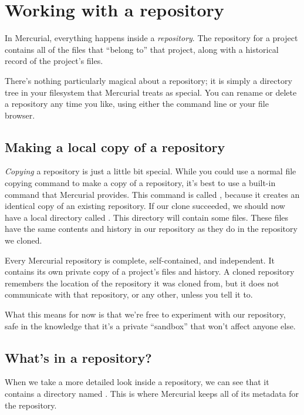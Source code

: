 \section{Working with a repository}

In Mercurial, everything happens inside a \emph{repository}.  The
repository for a project contains all of the files that ``belong to''
that project, along with a historical record of the project's files.

There's nothing particularly magical about a repository; it is simply
a directory tree in your filesystem that Mercurial treats as special.
You can rename or delete a repository any time you like, using either the
command line or your file browser.

\subsection{Making a local copy of a repository}

\emph{Copying} a repository is just a little bit special.  While you
could use a normal file copying command to make a copy of a
repository, it's best to use a built-in command that Mercurial
provides.  This command is called , because it creates an
identical copy of an existing repository.
If our clone succeeded, we should now have a local directory called
.  This directory will contain some files.
These files have the same contents and history in our repository as
they do in the repository we cloned.

Every Mercurial repository is complete, self-contained, and
independent.  It contains its own private copy of a project's files
and history.  A cloned repository remembers the location of the
repository it was cloned from, but it does not communicate with that
repository, or any other, unless you tell it to.

What this means for now is that we're free to experiment with our
repository, safe in the knowledge that it's a private ``sandbox'' that
won't affect anyone else.

\subsection{What's in a repository?}

When we take a more detailed look inside a repository, we can see that
it contains a directory named .  This is where Mercurial
keeps all of its metadata for the repository.

